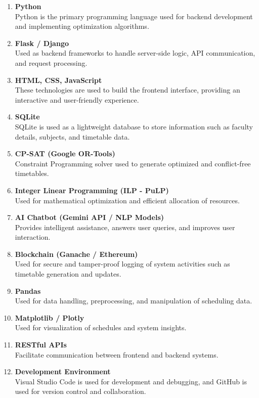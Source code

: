 \documentclass[a4paper, 12pt]{report}
\begin{document}
\begin{enumerate}

\item \textbf{Python} \\
Python is the primary programming language used for backend development and implementing optimization algorithms.

\item \textbf{Flask / Django} \\
Used as backend frameworks to handle server-side logic, API communication, and request processing.

\item \textbf{HTML, CSS, JavaScript} \\
These technologies are used to build the frontend interface, providing an interactive and user-friendly experience.

\item \textbf{SQLite} \\
SQLite is used as a lightweight database to store information such as faculty details, subjects, and timetable data.

\item \textbf{CP-SAT (Google OR-Tools)} \\
Constraint Programming solver used to generate optimized and conflict-free timetables.

\item \textbf{Integer Linear Programming (ILP - PuLP)} \\
Used for mathematical optimization and efficient allocation of resources.

\item \textbf{AI Chatbot (Gemini API / NLP Models)} \\
Provides intelligent assistance, answers user queries, and improves user interaction.

\item \textbf{Blockchain (Ganache / Ethereum)} \\
Used for secure and tamper-proof logging of system activities such as timetable generation and updates.

\item \textbf{Pandas} \\
Used for data handling, preprocessing, and manipulation of scheduling data.

\item \textbf{Matplotlib / Plotly} \\
Used for visualization of schedules and system insights.

\item \textbf{RESTful APIs} \\
Facilitate communication between frontend and backend systems.

\item \textbf{Development Environment} \\
Visual Studio Code is used for development and debugging, and GitHub is used for version control and collaboration.

\end{enumerate}
\end{document}
